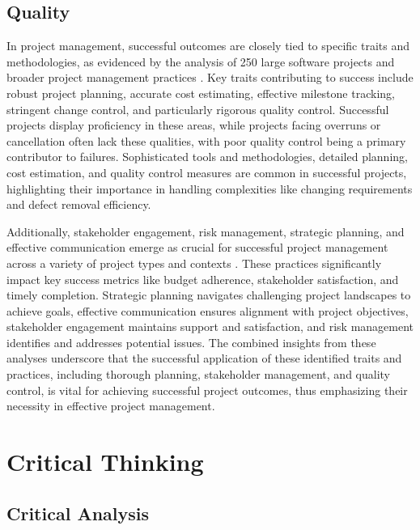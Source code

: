 \documentclass{article}
\begin{document}
\subsection{Quality}

In project management, successful outcomes are closely tied to specific traits and methodologies, as evidenced by the analysis of 250 large software projects and broader project management practices \cite{jones2004software}. Key traits contributing to success include robust project planning, accurate cost estimating, effective milestone tracking, stringent change control, and particularly rigorous quality control. Successful projects display proficiency in these areas, while projects facing overruns or cancellation often lack these qualities, with poor quality control being a primary contributor to failures. Sophisticated tools and methodologies, detailed planning, cost estimation, and quality control measures are common in successful projects, highlighting their importance in handling complexities like changing requirements and defect removal efficiency.

Additionally, stakeholder engagement, risk management, strategic planning, and effective communication emerge as crucial for successful project management across a variety of project types and contexts \cite{fernandes2013identifying}. These practices significantly impact key success metrics like budget adherence, stakeholder satisfaction, and timely completion. Strategic planning navigates challenging project landscapes to achieve goals, effective communication ensures alignment with project objectives, stakeholder engagement maintains support and satisfaction, and risk management identifies and addresses potential issues. The combined insights from these analyses underscore that the successful application of these identified traits and practices, including thorough planning, stakeholder management, and quality control, is vital for achieving successful project outcomes, thus emphasizing their necessity in effective project management.

\section{Critical Thinking}

\subsection{Critical Analysis}
\end{document}

